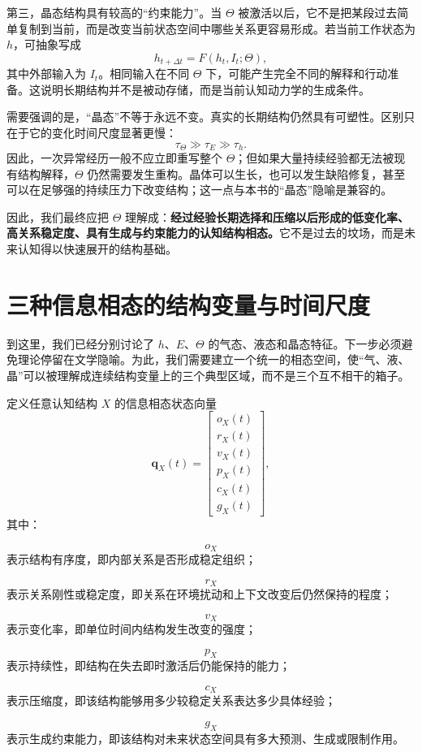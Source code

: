 第三，晶态结构具有较高的“约束能力”。当 $\Theta$ 被激活以后，它不是把某段过去简单复制到当前，而是改变当前状态空间中哪些关系更容易形成。若当前工作状态为 $h$，可抽象写成
\[
h_{t+\Delta t}
=
F
\left(
h_t,
I_t;
\Theta
\right),
\]
其中外部输入为 $I_t$。相同输入在不同 $\Theta$ 下，可能产生完全不同的解释和行动准备。这说明长期结构并不是被动存储，而是当前认知动力学的生成条件。

需要强调的是，“晶态”不等于永远不变。真实的长期结构仍然具有可塑性。区别只在于它的变化时间尺度显著更慢：
\[
\tau_\Theta
\gg
\tau_E
\gg
\tau_h.
\]
因此，一次异常经历一般不应立即重写整个 $\Theta$；但如果大量持续经验都无法被现有结构解释，$\Theta$ 仍然需要发生重构。晶体可以生长，也可以发生缺陷修复，甚至可以在足够强的持续压力下改变结构；这一点与本书的“晶态”隐喻是兼容的。

因此，我们最终应把 $\Theta$ 理解成：\textbf{经过经验长期选择和压缩以后形成的低变化率、高关系稳定度、具有生成与约束能力的认知结构相态。}它不是过去的坟场，而是未来认知得以快速展开的结构基础。


\section{三种信息相态的结构变量与时间尺度}

到这里，我们已经分别讨论了 $h$、$E$、$\Theta$ 的气态、液态和晶态特征。下一步必须避免理论停留在文学隐喻。为此，我们需要建立一个统一的相态空间，使“气、液、晶”可以被理解成连续结构变量上的三个典型区域，而不是三个互不相干的箱子。

定义任意认知结构 $X$ 的信息相态状态向量
\[
\mathbf q_X(t)
=
\begin{bmatrix}
o_X(t)\\
r_X(t)\\
v_X(t)\\
p_X(t)\\
c_X(t)\\
g_X(t)
\end{bmatrix},
\]
其中：

\[
o_X
\]
表示结构有序度，即内部关系是否形成稳定组织；

\[
r_X
\]
表示关系刚性或稳定度，即关系在环境扰动和上下文改变后仍然保持的程度；

\[
v_X
\]
表示变化率，即单位时间内结构发生改变的强度；

\[
p_X
\]
表示持续性，即结构在失去即时激活后仍能保持的能力；

\[
c_X
\]
表示压缩度，即该结构能够用多少较稳定关系表达多少具体经验；

\[
g_X
\]
表示生成约束能力，即该结构对未来状态空间具有多大预测、生成或限制作用。


